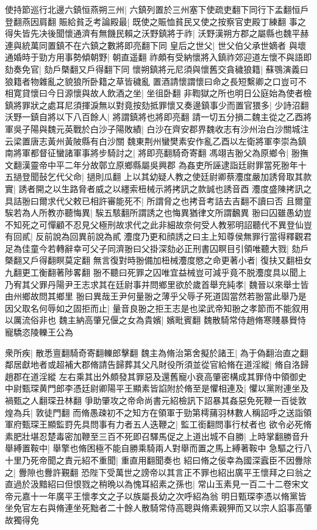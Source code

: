 使持節巡行北邊六鎮恒燕朔三州|{
	六鎮列置於三州塞下使疏吏翻下同行下孟翻恒戶登翻燕因肩翻}
賑給貧乏考論殿最|{
	既使之賑恤貧民又使之按察官吏殿丁練翻}
事之得失皆先决後聞懷通濟有無饑民賴之沃野鎮將于祚|{
	沃野漢朔方郡之屬縣也魏平赫連與統萬同置鎮不在六鎮之數將即亮翻下同}
皇后之世父|{
	世父伯父承世嫡者}
與壞通婚時于勁方用事勢傾朝野|{
	朝直遥翻}
祚頗有受納懷將入鎮祚郊迎道左懷不與語即劾奏免官|{
	劾戶槩翻又戶得翻下同}
懷朔鎮將元尼須與懷舊交貪穢狼籍|{
	蘇鶚演義曰狼籍者物雜亂之貌狼所卧籍之草皆穢亂}
置酒請懷謂懷曰命之長短繫卿之口豈可不相寛貸懷曰今日源懷與故人飲酒之坐|{
	坐徂卧翻}
非鞫獄之所也明日公庭始為使者檢鎮將罪狀之處耳尼須揮淚無以對竟按劾抵罪懷又奏邊鎮事少而置官猥多|{
	少詩沼翻}
沃野一鎮自將以下八百餘人|{
	將謂鎮將也將即亮翻}
請一切五分損二魏主從之乙酉將軍吳子陽與魏元英戰於白沙子陽敗績|{
	白沙在齊安郡界魏收志有沙州治白沙關城注云梁置唐志黃州黃陂縣有白沙關}
魏東荆州蠻樊素安作亂乙酉以左衛將軍李崇為鎮南將軍都督征蠻諸軍事將步騎討之|{
	將即亮翻騎奇寄翻}
馮翊吉翂父為原鄉令|{
	翂撫文翻漢靈帝中平二年分故鄣立原鄉縣屬吳興郡}
為姦吏所誣逮詣廷尉罪當死翂年十五撾登聞鼔乞代父命|{
	撾則瓜翻}
上以其幼疑人教之使廷尉卿蔡灋度嚴加誘脅取其款實|{
	誘者開之以生路脅者威之以纆索杻械示將拷訊之款誠也誘音酉}
灋度盛陳拷訊之具詰翂曰爾求代父敕已相許審能死不|{
	所謂脅之也拷音考詰去吉翻不讀曰否}
且爾童騃若為人所教亦聽悔異|{
	騃五駭翻所謂誘之也悔異猶律文所謂飜異}
翂曰囚雖愚幼豈不知死之可憚顧不忍見父極刑故求代之此非細故奈何受人教邪明詔聽代不異登仙豈有回貳|{
	反前說為回異前說為貳}
灋度乃更和顔誘之曰主上知尊侯無罪行當得釋觀君足為佳童今若轉辭幸可父子同濟翂曰父掛深劾必正刑書囚瞑目引領唯聽大戮|{
	劾戶槩翻又戶得翻瞑莫定翻}
無言復對時翂備加杻械灋度愍之命更著小者|{
	復扶又翻杻女九翻更工衡翻著陟畧翻}
翂不聽曰死罪之囚唯宜益械豈可減乎竟不脱灋度具以聞上乃宥其父罪丹陽尹王志求其在廷尉事并問鄉里欲於歲首舉充純孝|{
	魏晉以來舉士皆由州鄉故問其鄉里}
翂曰異哉王尹何量翂之薄乎父辱子死道固當然若翂當此舉乃是因父取名何辱如之固拒而止|{
	量音良翂之拒王志是也梁武帝知翂之孝節而不能叙用以厲流俗非也}
魏主納高肇兄偃之女為貴嬪|{
	嬪毗賓翻}
魏散騎常侍趙脩寒賤暴䝿恃寵驕恣陵轢王公為

衆所疾|{
	散悉亶翻騎奇寄翻轢郎擊翻}
魏主為脩治第舍擬於諸王|{
	為于偽翻治直之翻}
鄰居獻地者或超補大郡脩請告歸葬其父凡財役所須並從官給脩在道淫縱|{
	脩自洛歸趙郡在道淫縱}
左右乘其出外頗發其罪惡及還舊寵小衰高肇密構成其罪侍中領御史中尉甄琛黄門郎李憑廷尉卿陽平王顯素皆諂附於脩至是懼相連及|{
	懼以黨附連坐及禍甄之人翻琛丑林翻}
爭助肇攻之帝命尚書元紹檢訊下詔暴其姦惡免死鞭一百徙敦煌為兵|{
	敦徒門翻}
而脩愚疎初不之知方在領軍于勁第樗蒱羽林數人稱詔呼之送詣領軍府甄琛王顯監罸先具問事有力者五人迭鞭之|{
	監工銜翻問事行杖者也}
欲令必死脩素肥壯堪忍楚毒密加鞭至三百不死即召驛馬促之上道出城不自勝|{
	上時掌翻勝音升}
舉縛置鞍中|{
	舉擎也脩困極不能自勝乘騎兩人對舉而置之馬上縛著鞍中}
急驅之行八十里乃死帝聞之責元紹不重聞|{
	重直用翻聞奏也}
紹曰脩之佞幸為國深蠧臣不因釁除之|{
	釁隙也釁許覲翻}
恐陛下受萬世之謗帝以其言正不罪也紹出廣平王懷拜之曰翁之直過於汲黯紹曰但恨戮之稍晩以為愧耳紹素之孫也|{
	常山玉素見一百二十二卷宋文帝元嘉十一年廣平王懷孝文之子以族屬長幼之次呼紹為翁}
明日甄琛李憑以脩黨皆坐免官左右與脩連坐死黜者二十餘人散騎常侍高聰與脩素親狎而又以宗人諂事高肇故獨得免

